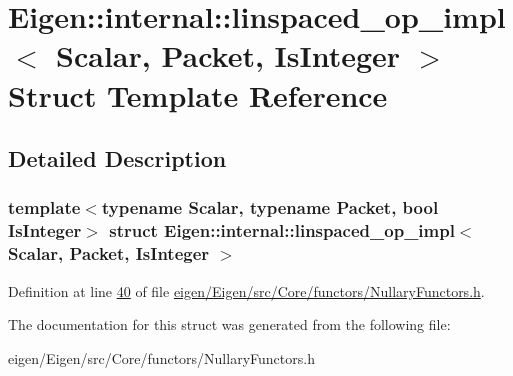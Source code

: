 \hypertarget{struct_eigen_1_1internal_1_1linspaced__op__impl}{}\section{Eigen\+:\+:internal\+:\+:linspaced\+\_\+op\+\_\+impl$<$ Scalar, Packet, Is\+Integer $>$ Struct Template Reference}
\label{struct_eigen_1_1internal_1_1linspaced__op__impl}


\subsection{Detailed Description}
\subsubsection*{template$<$typename Scalar, typename Packet, bool Is\+Integer$>$\newline
struct Eigen\+::internal\+::linspaced\+\_\+op\+\_\+impl$<$ Scalar, Packet, Is\+Integer $>$}



Definition at line \hyperlink{eigen_2_eigen_2src_2_core_2functors_2_nullary_functors_8h_source_l00040}{40} of file \hyperlink{eigen_2_eigen_2src_2_core_2functors_2_nullary_functors_8h_source}{eigen/\+Eigen/src/\+Core/functors/\+Nullary\+Functors.\+h}.



The documentation for this struct was generated from the following file\+:\begin{DoxyCompactItemize}
\item 
eigen/\+Eigen/src/\+Core/functors/\+Nullary\+Functors.\+h\end{DoxyCompactItemize}
